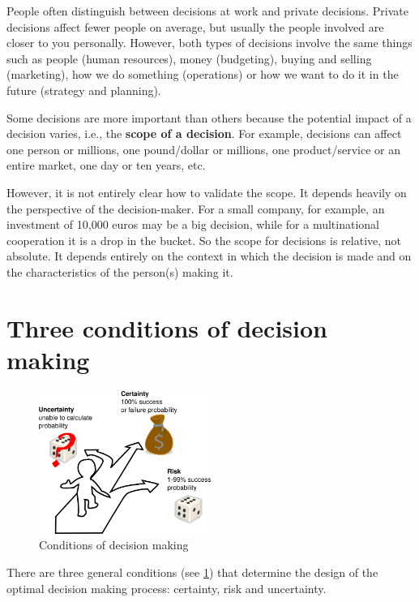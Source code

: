 \documentclass[
  12pt,
  oneside]{book}
\theoremstyle{definition}
\theoremstyle{definition}
\theoremstyle{definition}
\theoremstyle{definition}
\theoremstyle{remark}
\begin{document}
People often distinguish between decisions at work and private decisions. Private decisions affect fewer people on average, but usually the people involved are closer to you personally. However, both types of decisions involve the same things such as people (human resources), money (budgeting), buying and selling (marketing), how we do something (operations) or how we want to do it in the future (strategy and planning).

Some decisions are more important than others because the potential impact of a decision varies, i.e., the \textbf{scope of a decision}. For example, decisions can affect one person or millions, one pound/dollar or millions, one product/service or an entire market, one day or ten years, etc.

However, it is not entirely clear how to validate the scope. It depends heavily on the perspective of the decision-maker. For a small company, for example, an investment of 10,000 euros may be a big decision, while for a multinational cooperation it is a drop in the bucket. So the scope for decisions is relative, not absolute. It depends entirely on the context in which the decision is made and on the characteristics of the person(s) making it.

\section{Three conditions of decision making}\label{three-conditions-of-decision-making}

\begin{figure}
\centering
\includegraphics[width=0.5\textwidth,height=\textheight]{fig/risk-certainty-uncertainty.png}
\caption[\label{fig:3conditions} Conditions of decision making]{\label{fig:3conditions} Conditions of decision making\footnotemark{}}
\end{figure}

There are three general conditions (see \ref{fig:3conditions}) that determine the design of the optimal decision making process: certainty, risk and uncertainty.
\end{document}
